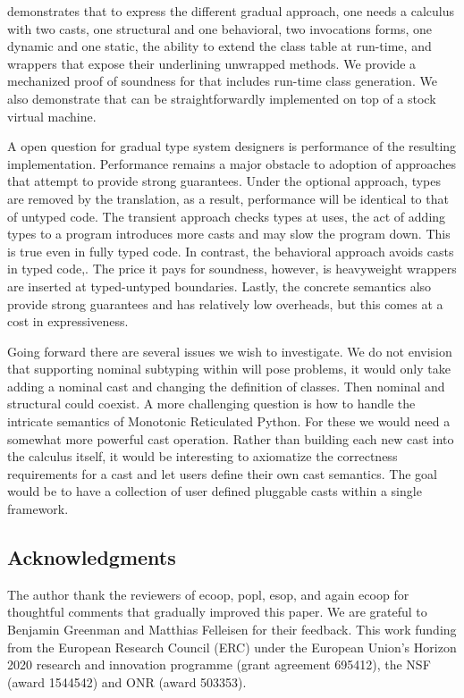 \documentclass[USenglish]{tex/lipics-v2016}f
\begin{document}
\kafka demonstrates that to express the different gradual approach, one
needs a calculus with two casts, one structural and one behavioral, two
invocations forms, one dynamic and one static, the ability to extend the
class table at run-time, and wrappers that expose their underlining
unwrapped methods.  We provide a mechanized proof of soundness for \kafka
that includes run-time class generation.  We also demonstrate that \kafka
can be straightforwardly implemented on top of a stock virtual machine.

A open question for gradual type system designers is performance of the
resulting implementation. Performance remains a major obstacle to adoption
of approaches that attempt to provide strong guarantees.  Under the optional
approach, types are removed by the translation, as a result, performance
will be identical to that of untyped code.  The transient approach checks
types at uses, the act of adding types to a program introduces more casts
and may slow the program down. This is true even in fully typed code.  In
contrast, the behavioral approach avoids casts in typed code,. The price it
pays for soundness, however, is heavyweight wrappers are inserted at
typed-untyped boundaries.  Lastly, the concrete semantics also provide
strong guarantees and has relatively low overheads, but this comes at a cost
in expressiveness.

Going forward there are several issues we wish to investigate.  We do not
envision that supporting nominal subtyping within \kafka will pose problems,
it would only take adding a nominal cast and changing the definition of
classes. Then nominal and structural could coexist. A more challenging
question is how to handle the intricate semantics of Monotonic Reticulated
Python. For these we would need a somewhat more powerful cast operation.
Rather than building each new cast into the calculus itself, it would be
interesting to axiomatize the correctness requirements for a cast and let
users define their own cast semantics. The goal would be to have a
collection of user defined pluggable casts within a single framework.

\subsection*{Acknowledgments} The author thank the reviewers of {\sc ecoop},
{\sc popl}, {\sc esop}, and again {\sc ecoop} for thoughtful comments that
gradually improved this paper. We are grateful to Benjamin Greenman and
Matthias Felleisen for their feedback.  This work funding from the European
Research Council (ERC) under the European Union’s Horizon 2020 research and
innovation programme (grant agreement 695412), the NSF (award 1544542) and
ONR (award 503353).




\end{document}
